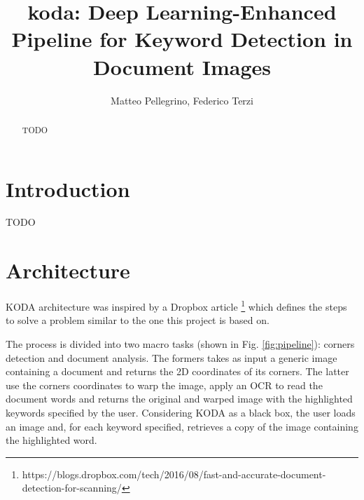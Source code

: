 \documentclass[a4paper]{article}
\title{koda: Deep Learning-Enhanced Pipeline for Keyword Detection in Document Images}
\author{Matteo Pellegrino, Federico Terzi}
\begin{document}
\maketitle

\begin{abstract}
TODO
\end{abstract}

\section{Introduction}
TODO

\section{Architecture}

KODA architecture was inspired by a Dropbox article \footnote{https://blogs.dropbox.com/tech/2016/08/fast-and-accurate-document-detection-for-scanning/} which defines the steps to solve a problem similar to the one this project is based on.

The process is divided into two macro tasks (shown in Fig. \ref{fig:pipeline}): corners detection and document analysis. The formers takes as input a generic image containing a document and returns the 2D coordinates of its corners. The latter use the corners coordinates to warp the image, apply an OCR to read the document words and returns the original and warped image with the highlighted keywords specified by the user. Considering KODA as a black box, the user loads an image and, for each keyword specified, retrieves a copy of the image containing the highlighted word.
\end{document}
